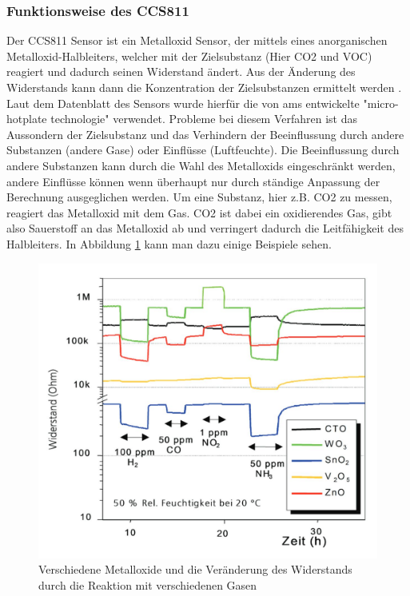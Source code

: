 \documentclass[]{article}
\begin{document}
				\subsubsection{Funktionsweise des CCS811}
					Der CCS811 Sensor ist ein Metalloxid Sensor, der mittels eines anorganischen Metalloxid-Halbleiters, welcher mit der Zielsubstanz (Hier CO2 und VOC) reagiert und dadurch seinen Widerstand ändert. Aus der Änderung des Widerstands kann dann die Konzentration der Zielsubstanzen ermittelt werden \cite{wiki_gassensor}. Laut dem Datenblatt des Sensors wurde hierfür die von ams entwickelte "micro-hotplate technologie" verwendet. Probleme bei diesem Verfahren ist das Aussondern der Zielsubstanz und das Verhindern der Beeinflussung durch andere Substanzen (andere Gase) oder Einflüsse (Luftfeuchte). Die Beeinflussung durch andere Substanzen kann durch die Wahl des Metalloxids eingeschränkt werden, andere Einflüsse können wenn überhaupt nur durch ständige Anpassung der Berechnung ausgeglichen werden. Um eine Substanz, hier z.B. CO2 zu messen, reagiert das Metalloxid mit dem Gas. CO2 ist dabei ein oxidierendes Gas, gibt also Sauerstoff an das Metalloxid ab und verringert dadurch die Leitfähigkeit des Halbleiters. In Abbildung \ref{img:metalloxid_sensor} kann man dazu einige Beispiele sehen.
					\begin{figure}[!h]
						\centering
						\includegraphics[scale=0.30]{images/metalloxid_sensor}
						\caption{Verschiedene Metalloxide und die Veränderung des Widerstands durch die Reaktion mit verschiedenen Gasen\cite{metalloxidsensor}}
						\label{img:metalloxid_sensor}
					\end{figure}
\end{document}
